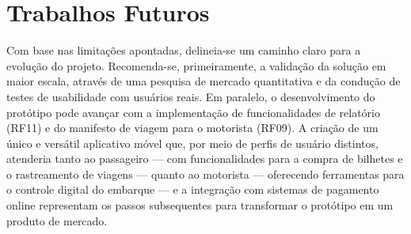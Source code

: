 \section{Trabalhos Futuros}

Com base nas limitações apontadas, delineia-se um caminho claro para a evolução do projeto. Recomenda-se, primeiramente, a validação da solução em maior escala, através de uma pesquisa de mercado quantitativa e da condução de testes de usabilidade com usuários reais. Em paralelo, o desenvolvimento do protótipo pode avançar com a implementação de funcionalidades de relatório (RF11) e do manifesto de viagem para o motorista (RF09). A criação de um único e versátil aplicativo móvel que, por meio de perfis de usuário distintos, atenderia tanto ao passageiro — com funcionalidades para a compra de bilhetes e o rastreamento de viagens — quanto ao motorista — oferecendo ferramentas para o controle digital do embarque — e a integração com sistemas de pagamento online representam os passos subsequentes para transformar o protótipo em um produto de mercado.